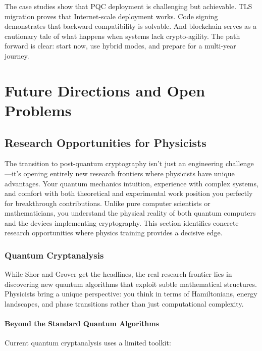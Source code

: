 \documentclass[11pt,a4paper]{article}
\begin{document}
The case studies show that PQC deployment is challenging but achievable. TLS migration proves that Internet-scale deployment works. Code signing demonstrates that backward compatibility is solvable. And blockchain serves as a cautionary tale of what happens when systems lack crypto-agility. The path forward is clear: start now, use hybrid modes, and prepare for a multi-year journey.

\section{Future Directions and Open Problems}
\label{sec:future}

\subsection{Research Opportunities for Physicists}
\label{sec:research-opportunities}

The transition to post-quantum cryptography isn't just an engineering challenge—it's opening entirely new research frontiers where physicists have unique advantages. Your quantum mechanics intuition, experience with complex systems, and comfort with both theoretical and experimental work position you perfectly for breakthrough contributions. Unlike pure computer scientists or mathematicians, you understand the physical reality of both quantum computers and the devices implementing cryptography. This section identifies concrete research opportunities where physics training provides a decisive edge.

\subsubsection{Quantum Cryptanalysis}

While Shor and Grover get the headlines, the real research frontier lies in discovering new quantum algorithms that exploit subtle mathematical structures. Physicists bring a unique perspective: you think in terms of Hamiltonians, energy landscapes, and phase transitions rather than just computational complexity.

\paragraph{Beyond the Standard Quantum Algorithms}

Current quantum cryptanalysis uses a limited toolkit:
\end{document}

